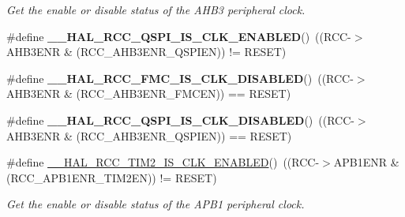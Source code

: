 \begin{DoxyCompactItemize}
\begin{DoxyCompactList}\small\item\em Get the enable or disable status of the A\+H\+B3 peripheral clock. \end{DoxyCompactList}\item 
\mbox{\label{group___r_c_c_ex___peripheral___clock___enable___disable___status_ga041cb673a0d3d614577723362110f81b}} 
\#define {\bfseries \+\_\+\+\_\+\+H\+A\+L\+\_\+\+R\+C\+C\+\_\+\+Q\+S\+P\+I\+\_\+\+I\+S\+\_\+\+C\+L\+K\+\_\+\+E\+N\+A\+B\+L\+ED}()~((R\+CC-\/$>$A\+H\+B3\+E\+NR \& (R\+C\+C\+\_\+\+A\+H\+B3\+E\+N\+R\+\_\+\+Q\+S\+P\+I\+EN)) != R\+E\+S\+ET)
\item 
\mbox{\label{group___r_c_c_ex___peripheral___clock___enable___disable___status_gaa10a685a46de1822cc3004073ff47f65}} 
\#define {\bfseries \+\_\+\+\_\+\+H\+A\+L\+\_\+\+R\+C\+C\+\_\+\+F\+M\+C\+\_\+\+I\+S\+\_\+\+C\+L\+K\+\_\+\+D\+I\+S\+A\+B\+L\+ED}()~((R\+CC-\/$>$A\+H\+B3\+E\+NR \& (R\+C\+C\+\_\+\+A\+H\+B3\+E\+N\+R\+\_\+\+F\+M\+C\+EN)) == R\+E\+S\+ET)
\item 
\mbox{\label{group___r_c_c_ex___peripheral___clock___enable___disable___status_ga8b55c72b44466fa1ddcd9681b6cbd61f}} 
\#define {\bfseries \+\_\+\+\_\+\+H\+A\+L\+\_\+\+R\+C\+C\+\_\+\+Q\+S\+P\+I\+\_\+\+I\+S\+\_\+\+C\+L\+K\+\_\+\+D\+I\+S\+A\+B\+L\+ED}()~((R\+CC-\/$>$A\+H\+B3\+E\+NR \& (R\+C\+C\+\_\+\+A\+H\+B3\+E\+N\+R\+\_\+\+Q\+S\+P\+I\+EN)) == R\+E\+S\+ET)
\item 
\#define \mbox{\hyperlink{group___r_c_c_ex___peripheral___clock___enable___disable___status_gadee5016adb1c8b62a5bb05f055859de0}{\+\_\+\+\_\+\+H\+A\+L\+\_\+\+R\+C\+C\+\_\+\+T\+I\+M2\+\_\+\+I\+S\+\_\+\+C\+L\+K\+\_\+\+E\+N\+A\+B\+L\+ED}}()~((R\+CC-\/$>$A\+P\+B1\+E\+NR \& (R\+C\+C\+\_\+\+A\+P\+B1\+E\+N\+R\+\_\+\+T\+I\+M2\+EN)) != R\+E\+S\+ET)
\begin{DoxyCompactList}\small\item\em Get the enable or disable status of the A\+P\+B1 peripheral clock. \end{DoxyCompactList}\item 
\mbox{\label{group___r_c_c_ex___peripheral___clock___enable___disable___status_gaf6090239db6a8a6917b3f3accea15ed0}} 

\end{DoxyCompactItemize}
